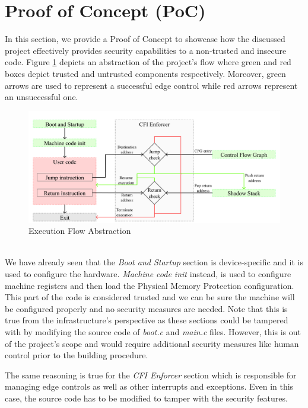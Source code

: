\section{Proof of Concept (PoC)}
\label{sec:project_poc}

In this section, we provide a Proof of Concept to showcase how the discussed
project effectively provides security capabilities to a non-trusted and insecure
code. Figure \ref{fig:functioning} depicts an abstraction of the project's flow where
green and red boxes depict trusted and untrusted components respectively.
Moreover, green arrows are used to represent a successful edge control while red
arrows represent an unsuccessful one. \\
\begin{figure}[htbp]
  \centering
  \includegraphics[width=.9\linewidth]{images/functioning.png}
  \caption{Execution Flow Abstraction}
  \label{fig:functioning}
\end{figure}
\\

We have already seen that the \textit{Boot and Startup} section is device-specific
and it is used to configure the hardware. \textit{Machine code init} instead, is
used to configure machine registers and then load the Physical Memory Protection
configuration. This part of the code is considered trusted and we can be sure
the machine will be configured properly and no security measures are needed. Note
that this is true from the infrastructure's perspective as these sections could be
tampered with by modifying the source code of \textit{boot.c} and \textit{main.c}
files. However, this is out of the project's scope and would require additional security
measures like human control prior to the building procedure.

The same reasoning is true for the \textit{CFI Enforcer} section which is
responsible for managing edge controls as well as other interrupts and
exceptions. Even in this case, the source code has to be modified to tamper with
the security features.

